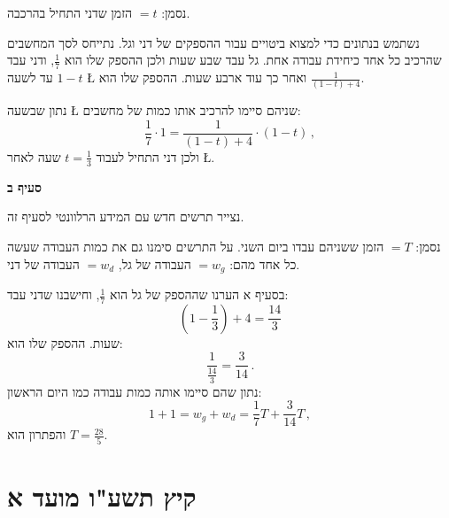 נסמן:
$=t$
הזמן שדני התחיל בהרכבה.

נשתמש בנתונים כדי למצוא ביטויים עבור ההספקים של דני וגל. נתייחס לסך המחשבים שהרכיב כל אחד כיחידת עבודה אחת. גל עבד שבע שעות ולכן ההספק שלו הוא
$\displaystyle \frac{1}{7}$,
ודני עבד 
$1-t$
עד לשעה 
\L{}
ואחר כך עוד ארבע שעות. ההספק שלו הוא
$\displaystyle \frac{1}{(1-t)+4}$.

\np
נתון שבשעה 
\L{}
שניהם סיימו להרכיב אותו כמות של מחשבים:
\[
\frac{1}{7}\cdot 1 = \frac{1}{(1-t)+4} \cdot (1-t)\,,
\]
ולכן דני התחיל לעבוד
$\displaystyle t=\frac{1}{3}$
שעה לאחר
\L{}.

\smallskip

\textbf{סעיף ב}

נצייר תרשים חדש עם המידע הרלוונטי לסעיף זה.

\begin{center}
\end{center}
נסמן: 
$=T$
הזמן ששניהם עבדו ביום השני. על התרשים סימנו גם את כמות העבודה שעשה כל אחד מהם:
$=w_g$
העבודה של גל,
$=w_d$
העבודה של דני.

\smallskip

בסעיף א הערנו שההספק של גל הוא
$\displaystyle \frac{1}{7}$,
וחישבנו שדני עבד:
\[
\left(1-\frac{1}{3}\right)+4=\frac{14}{3}
\]
שעות. ההספק שלו הוא:
\[
\frac{1}{\frac{14}{3}}=\frac{3}{14}\,.
\]
נתון שהם סיימו אותה כמות עבודה כמו היום הראשון:
\[
1+1=w_g+w_d=\frac{1}{7}T + \frac{3}{14}T\,,
\]
והפתרון הוא 
$T=\displaystyle \frac{28}{5}$.


\np

\section{קיץ תשע"ו מועד א}

